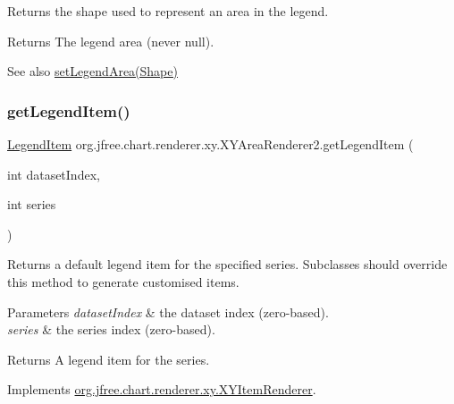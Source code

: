 Returns the shape used to represent an area in the legend.

\begin{DoxyReturn}{Returns}
The legend area (never {\ttfamily null}).
\end{DoxyReturn}
\begin{DoxySeeAlso}{See also}
\mbox{\hyperlink{classorg_1_1jfree_1_1chart_1_1renderer_1_1xy_1_1_x_y_area_renderer2_a315e00656c54d8f88ef86f4b7205c42e}{set\+Legend\+Area(\+Shape)}} 
\end{DoxySeeAlso}
\mbox{\label{classorg_1_1jfree_1_1chart_1_1renderer_1_1xy_1_1_x_y_area_renderer2_aceed297cd6a487760ce33af182edd8c0}} 
\subsubsection{\texorpdfstring{get\+Legend\+Item()}{getLegendItem()}}
{\footnotesize\ttfamily \mbox{\hyperlink{classorg_1_1jfree_1_1chart_1_1_legend_item}{Legend\+Item}} org.\+jfree.\+chart.\+renderer.\+xy.\+X\+Y\+Area\+Renderer2.\+get\+Legend\+Item (\begin{DoxyParamCaption}\item[{int}]{dataset\+Index,  }\item[{int}]{series }\end{DoxyParamCaption})}

Returns a default legend item for the specified series. Subclasses should override this method to generate customised items.


\begin{DoxyParams}{Parameters}
{\em dataset\+Index} & the dataset index (zero-\/based). \\
\hline
{\em series} & the series index (zero-\/based).\\
\hline
\end{DoxyParams}
\begin{DoxyReturn}{Returns}
A legend item for the series. 
\end{DoxyReturn}


Implements \mbox{\hyperlink{interfaceorg_1_1jfree_1_1chart_1_1renderer_1_1xy_1_1_x_y_item_renderer_a792c3e8c39bf57711528cd8064d2ddb5}{org.\+jfree.\+chart.\+renderer.\+xy.\+X\+Y\+Item\+Renderer}}.

